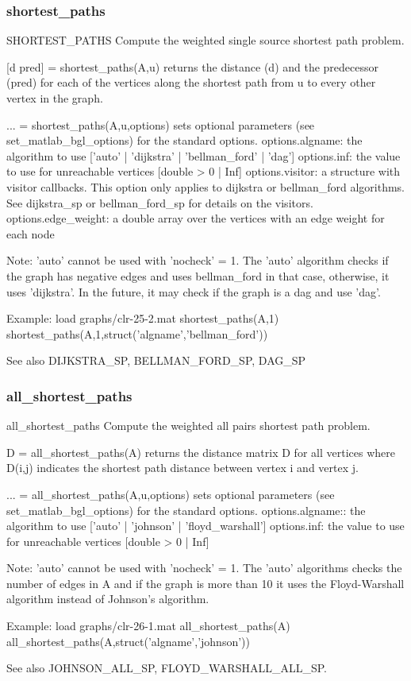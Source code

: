 \subsubsection*{shortest\_paths}
\begin{mcode}
  SHORTEST_PATHS Compute the weighted single source shortest path problem.
 
  [d pred] = shortest_paths(A,u) returns the distance (d) and the predecessor
  (pred) for each of the vertices along the shortest path from u to every
  other vertex in the graph.  
  
  ... = shortest_paths(A,u,options) sets optional parameters (see 
  set_matlab_bgl_options) for the standard options.
    options.algname: the algorithm to use 
        [{'auto'} | 'dijkstra' | 'bellman_ford' | 'dag']
    options.inf: the value to use for unreachable vertices 
        [double > 0 | {Inf}]
    options.visitor: a structure with visitor callbacks.  This option only
        applies to dijkstra or bellman_ford algorithms.  See dijkstra_sp or
        bellman_ford_sp for details on the visitors.
    options.edge_weight: a double array over the vertices with an edge
        weight for each node
 
  Note: 'auto' cannot be used with 'nocheck' = 1.  The 'auto' algorithm
  checks if the graph has negative edges and uses bellman_ford in that
  case, otherwise, it uses 'dijkstra'.  In the future, it may check if the
  graph is a dag and use 'dag'.  
 
  Example:
     load graphs/clr-25-2.mat
     shortest_paths(A,1)
     shortest_paths(A,1,struct('algname','bellman_ford'))
 
  See also DIJKSTRA_SP, BELLMAN_FORD_SP, DAG_SP
\end{mcode}
\newpage
\subsubsection*{all\_shortest\_paths}
\begin{mcode}
  all_shortest_paths Compute the weighted all pairs shortest path problem.
 
  D = all_shortest_paths(A) returns the distance matrix D for all vertices
  where D(i,j) indicates the shortest path distance between vertex i and
  vertex j.  
  
  ... = all_shortest_paths(A,u,options) sets optional parameters (see 
  set_matlab_bgl_options) for the standard options.
    options.algname:: the algorithm to use 
        [{'auto'} | 'johnson' | 'floyd_warshall']
    options.inf: the value to use for unreachable vertices 
        [double > 0 | {Inf}]
 
  Note: 'auto' cannot be used with 'nocheck' = 1.  The 'auto' algorithms
  checks the number of edges in A and if the graph is more than 10%
  it uses the Floyd-Warshall algorithm instead of Johnson's algorithm.
 
  Example:
     load graphs/clr-26-1.mat
     all_shortest_paths(A)
     all_shortest_paths(A,struct('algname','johnson'))
 
  See also JOHNSON_ALL_SP, FLOYD_WARSHALL_ALL_SP.
\end{mcode}
\newpage
